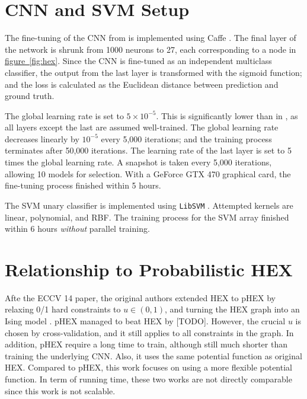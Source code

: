\documentclass[11pt,a4paper]{article}
\begin{document}
\section{CNN and SVM Setup}
\label{sec:setup}

The fine-tuning of the CNN from \cite{krizhevsky2012imagenet} is implemented using Caffe \cite{jia2014caffe}. The final layer of the network is shrunk from 1000 neurons to 27, each corresponding to a node in \hyperref[fig:hex]{figure~\ref{fig:hex}}. Since the CNN is fine-tuned as an independent multiclass classifier, the output from the last layer is transformed with the sigmoid function; and the loss is calculated as the Euclidean distance between prediction and ground truth.

The global learning rate is set to $5\times10^{-5}$. This is significantly lower than in \cite{krizhevsky2012imagenet}, as all layers except the last are assumed well-trained. The global learning rate decreases linearly by $10^{-5}$ every 5,000 iterations; and the training process terminates after 50,000 iterations. The learning rate of the last layer is set to 5 times the global learning rate. A snapshot is taken every 5,000 iterations, allowing 10 models for selection. With a GeForce GTX 470 graphical card, the fine-tuning process finished within 5 hours.

The SVM unary classifier is implemented using \texttt{LibSVM} \cite{libsvm}. Attempted kernels are linear, polynomial, and RBF. The training process for the SVM array finished within 6 hours \emph{without} parallel training.

\section{Relationship to Probabilistic HEX}

Afte the ECCV 14 paper, the original authors extended HEX to pHEX by relaxing 0/1 hard constraints to $u\in(0,1)$, and turning the HEX graph into an Ising model \cite{ding2015probabilistic}. pHEX managed to beat HEX by [TODO]. However, the crucial $u$ is chosen by cross-validation, and it still applies to all constraints in the graph. In addition, pHEX require a long time to train, although still much shorter than training the underlying CNN. Also, it uses the same potential function as original HEX. Compared to pHEX, this work focuses on using a more flexible potential function. In term of running time, these two works are not directly comparable since this work is not scalable.
\end{document}

